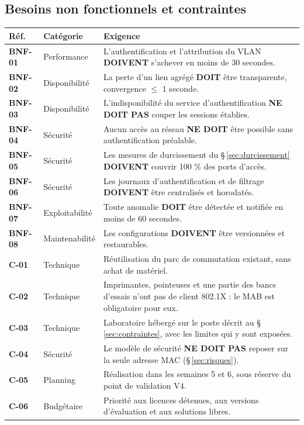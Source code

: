 \documentclass[11pt,a4paper]{article}
\newcommand{\rid}[1]{\textcolor{primary}{\textbf{\small #1}}}
\begin{document}
\subsection{Besoins non fonctionnels et contraintes}
\begin{table}[H]
\centering
\begin{tabularx}{\textwidth}{L{1.6cm} L{2.7cm} Y}
\toprule
{}\textbf{Réf.} & \textbf{Catégorie} & \textbf{Exigence} \\
\midrule
\rid{BNF-01} & Performance & L'authentification et l'attribution du VLAN \textbf{DOIVENT} s'achever en moins de 30 secondes. \\
\rid{BNF-02} & Disponibilité & La perte d'un lien agrégé \textbf{DOIT} être transparente, convergence $\leq$ 1 seconde. \\
\rid{BNF-03} & Disponibilité & L'indisponibilité du service d'authentification \textbf{NE DOIT PAS} couper les sessions établies. \\
\rid{BNF-04} & Sécurité & Aucun accès au réseau \textbf{NE DOIT} être possible sans authentification préalable. \\
\rid{BNF-05} & Sécurité & Les mesures de durcissement du \S\,\ref{sec:durcissement} \textbf{DOIVENT} couvrir 100 \% des ports d'accès. \\
\rid{BNF-06} & Sécurité & Les journaux d'authentification et de filtrage \textbf{DOIVENT} être centralisés et horodatés. \\
\rid{BNF-07} & Exploitabilité & Toute anomalie \textbf{DOIT} être détectée et notifiée en moins de 60 secondes. \\
\rid{BNF-08} & Maintenabilité & Les configurations \textbf{DOIVENT} être versionnées et restaurables. \\
\midrule
\rid{C-01} & Technique & Réutilisation du parc de commutation existant, sans achat de matériel. \\
\rid{C-02} & Technique & Imprimantes, pointeuses et une partie des bancs d'essais n'ont pas de client 802.1X : le MAB est obligatoire pour eux. \\
\rid{C-03} & Technique & Laboratoire hébergé sur le poste décrit au \S\,\ref{sec:contraintes}, avec les limites qui y sont exposées. \\
\rid{C-04} & Sécurité & Le modèle de sécurité \textbf{NE DOIT PAS} reposer sur la seule adresse MAC (\S\,\ref{sec:risques}). \\
\rid{C-05} & Planning & Réalisation dans les semaines 5 et 6, sous réserve du point de validation V4. \\
\rid{C-06} & Budgétaire & Priorité aux licences détenues, aux versions d'évaluation et aux solutions libres. \\
\bottomrule
\end{tabularx}
\end{table}
\end{document}
